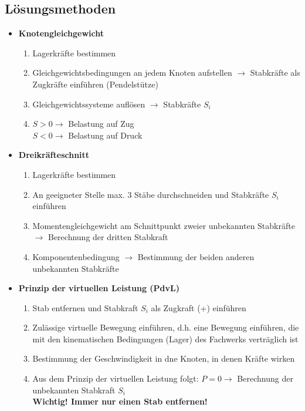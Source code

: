 \documentclass[numerate]{cheatsheet}
\begin{document}
    \subsection{Lösungsmethoden}
        \begin{scriptsize}
            \begin{itemize}
                \item \textbf{Knotengleichgewicht}
                \begin{enumerate}
                    \item Lagerkräfte bestimmen
                    \item Gleichgewichtsbedingungen an jedem Knoten aufstellen $\to$ Stabkräfte als Zugkräfte einführen (Pendelstütze)
                    \item Gleichgewichtssysteme auflösen $\to$ Stabkräfte $S_i$
                    \item $S>0 \to$ Belastung auf Zug
                    \\$S<0 \to$ Belastung auf Druck
                \end{enumerate}
                \item \textbf{Dreikräfteschnitt}
                \begin{enumerate}
                    \item Lagerkräfte bestimmen
                    \item An geeigneter Stelle max. 3 Stäbe durchschneiden und Stabkräfte $S_i$ einführen 
                    \item Momentengleichgewicht am Schnittpunkt zweier unbekannten Stabkräfte $\to$ Berechnung der dritten Stabkraft
                    \item Komponentenbedingung $\to$ Bestimmung der beiden anderen unbekannten Stabkräfte
                \end{enumerate}
                \item \textbf{Prinzip der virtuellen Leistung (PdvL)}
                \begin{enumerate}
                    \item Stab entfernen und Stabkraft $S_i$ als Zugkraft (+) einführen
                    \item Zulässige virtuelle Bewegung einführen, d.h. eine Bewegung einführen, die mit den kinematischen Bedingungen (Lager) des Fachwerks verträglich ist
                    \item Bestimmung der Geschwindigkeit in dne Knoten, in denen Kräfte wirken
                    \item Aus dem Prinzip der virtuellen Leistung folgt: $P = 0 \to $ Berechnung der unbekannten Stabkraft $S_i$ 
                    \\\textbf{Wichtig! Immer nur einen Stab entfernen!}
                \end{enumerate}
            \end{itemize}
        \end{scriptsize}
\end{document}
